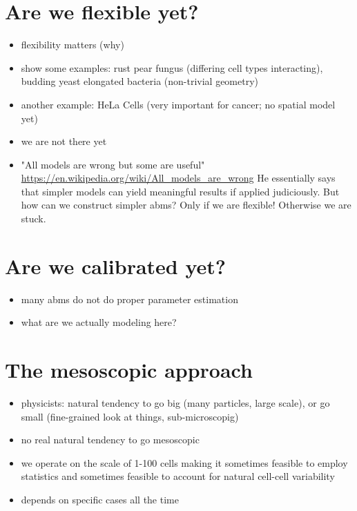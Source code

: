\section{Are we flexible yet?}
\begin{itemize}
    \item flexibility matters (why)
    \item show some examples: rust pear fungus (differing cell types interacting), budding yeast
        elongated bacteria (non-trivial geometry)
    \item another example: HeLa Cells (very important for cancer; no spatial model yet)
    \item we are not there yet
    \item "All models are wrong but some are useful"
        \url{https://en.wikipedia.org/wiki/All_models_are_wrong}
        He essentially says that simpler models can yield meaningful results if applied judiciously.
        But how can we construct simpler \acp{abm}? Only if we are flexible! Otherwise we are stuck.
\end{itemize}

\section{Are we calibrated yet?}
\begin{itemize}
    \item many \acp{abm} do not do proper parameter estimation
    \item what are we actually modeling here?
\end{itemize}

\section{The mesoscopic approach}
\begin{itemize}
    \item physicists: natural tendency to go big (many particles, large scale), or go small
        (fine-grained look at things, sub-microscopig)
    \item no real natural tendency to go mesoscopic
    \item we operate on the scale of 1-100 cells making it sometimes feasible to employ statistics
        and sometimes feasible to account for natural cell-cell variability
    \item depends on specific cases all the time
\end{itemize}

